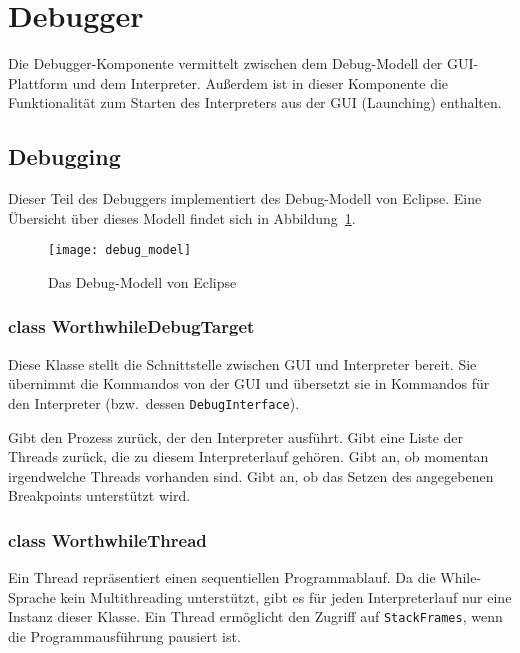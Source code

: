 \section{Debugger}

Die Debugger-Komponente vermittelt zwischen dem Debug-Modell der GUI-Plattform und dem Interpreter. Außerdem ist in dieser Komponente die Funktionalität zum Starten des Interpreters aus der GUI (Launching) enthalten.

\subsection{Debugging}

Dieser Teil des Debuggers implementiert des Debug-Modell von Eclipse. Eine Übersicht über dieses Modell findet sich in Abbildung~\ref{debugmodel}.

\begin{figure}
	\label{debugmodel}
	\caption[B]{Das Debug-Modell von Eclipse\footnotemark}
	\centering
	\texttt{[image: debug\_model]}
\end{figure}

\subsubsection{class WorthwhileDebugTarget}

Diese Klasse stellt die Schnittstelle zwischen GUI und Interpreter bereit. Sie übernimmt die Kommandos von der GUI und übersetzt sie in Kommandos für den Interpreter (bzw.\ dessen \texttt{DebugInterface}).

\begin{description}
	 Gibt den Prozess zurück, der den Interpreter ausführt.
	 Gibt eine Liste der Threads zurück, die zu diesem Interpreterlauf gehören.
	 Gibt an, ob momentan irgendwelche Threads vorhanden sind.
	 Gibt an, ob das Setzen des angegebenen Breakpoints unterstützt wird.
\end{description}

\subsubsection{class WorthwhileThread}

Ein Thread repräsentiert einen sequentiellen Programmablauf. Da die While-Sprache kein Multithreading unterstützt, gibt es für jeden Interpreterlauf nur eine Instanz dieser Klasse. Ein Thread ermöglicht den Zugriff auf \texttt{StackFrames}, wenn die Programmausführung pausiert ist.

